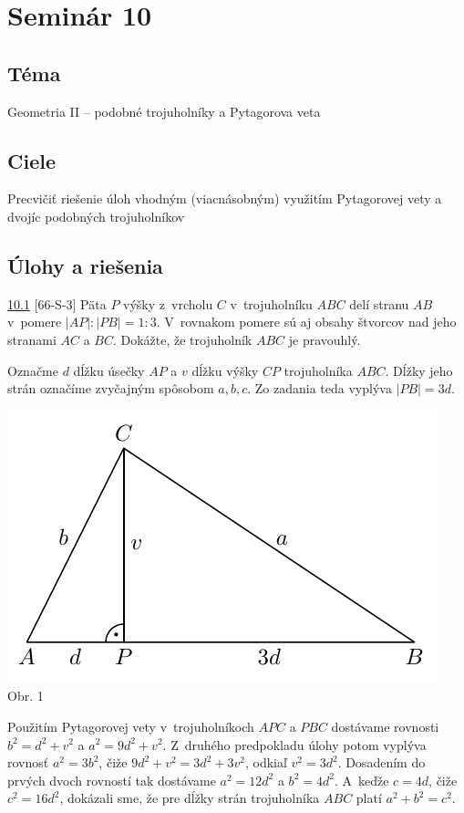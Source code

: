 \section*{Seminár 10}
\subsection*{Téma}
Geometria II -- podobné trojuholníky a Pytagorova veta

\subsection*{Ciele}
Precvičiť riešenie úloh vhodným (viacnásobným) využitím Pytagorovej vety a dvojíc podobných trojuholníkov

\subsection*{Úlohy a riešenia}
\begin{tcolorbox}[breakable,notitle,boxrule=0pt,colback=light-gray,colframe=light-gray]\ul{10.1} [66-S-3] Päta $P$ výšky z~vrcholu $C$ v~trojuholníku $ABC$ delí stranu $AB$ v~pomere $|AP| : |PB|= 1 : 3$. V~rovnakom pomere sú aj obsahy štvorcov nad jeho stranami $AC$ a $BC$.
Dokážte, že trojuholník $ABC$ je pravouhlý.
\end{tcolorbox}

\rieh Označme $d$ dĺžku úsečky $AP$ a $v$ dĺžku výšky $CP$ trojuholníka $ABC$. Dĺžky jeho strán označíme zvyčajným spôsobom $a, b, c$. Zo zadania teda vyplýva $|PB| = 3d$.
\begin{center}
\includegraphics{obrazky/66S3.pdf}\\

Obr. 1
\end{center}
Použitím Pytagorovej vety v~trojuholníkoch $APC$ a $PBC$ dostávame rovnosti $b^2= d^2 +v^2$ a $a^2 = 9d^2 +v^2$. Z~druhého predpokladu úlohy potom vyplýva rovnosť $a^2 = 3b^2$, čiže $9d^2 + v^2 = 3d^2 + 3v^2$, odkiaľ $v^2 = 3d^2$. Dosadením do prvých dvoch rovností tak dostávame $a^2 = 12d^2$ a $b^2 = 4d^2$. A~keďže $c = 4d$, čiže $c^2 = 16d^2$, dokázali sme, že pre dĺžky strán trojuholníka $ABC$ platí $a^2 + b^2 = c^2$.

